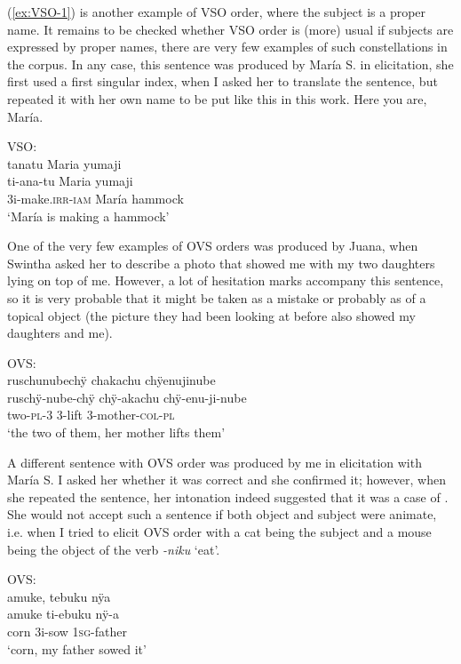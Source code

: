 (\ref{ex:VSO-1}) is another example of VSO order, where the subject is a proper name. It remains to be checked whether VSO order is (more) usual if subjects are expressed by proper names, there are very few examples of such constellations in the corpus. In any case, this sentence was produced by María S. in elicitation, she first used a first singular index, when I asked her to translate the sentence, but repeated it with her own name to be put like this in this work. Here you are, María.

\ea\label{ex:VSO-1}
\begingl
\glpreamble  \textup{VSO:}\\tanatu Maria yumaji\\
\gla ti-ana-tu Maria yumaji\\
\glb 3i-make.\textsc{irr}-\textsc{iam} María hammock\\
\glft ‘María is making a hammock’
\endgl
\trailingcitation{[rxx-e181022le]}
\xe

One of the very few examples of OVS orders was produced by Juana, when Swintha asked her to describe a photo that showed me with my two daughters lying on top of me. However, a lot of hesitation marks accompany this sentence, so it is very probable that it might be taken as a mistake or probably as  of a topical object (the picture they had been looking at before also showed my daughters and me).


\ea\label{ex:OVSfirst}
\begingl
\glpreamble \textup{OVS:}\\ruschunubechÿ chakachu chÿenujinube\\
\gla ruschÿ-nube-chÿ chÿ-akachu chÿ-enu-ji-nube\\
\glb two-\textsc{pl}-3 3-lift 3-mother-\textsc{col}-\textsc{pl}\\
\glft ‘the two of them, her mother lifts them’
\endgl
\trailingcitation{[jxx-p141024s-1.21]}
\xe

A different sentence with OVS order was produced by me in elicitation with María S. I asked her whether it was correct and she confirmed it; however, when she repeated the sentence, her intonation indeed suggested that it was a case of . She would not accept such a sentence if both object and subject were animate, i.e. when I tried to elicit OVS order with a cat being the subject and a mouse being the object of the verb \textit{-niku} ‘eat’.

\ea\label{ex:OVSsecond}
\begingl
\glpreamble \textup{OVS:}\\amuke, tebuku nÿa\\
\gla amuke ti-ebuku nÿ-a\\
\glb corn 3i-sow 1\textsc{sg}-father\\
\glft ‘corn, my father sowed it’
\endgl
\trailingcitation{[rxx-e181024l]}
\xe


